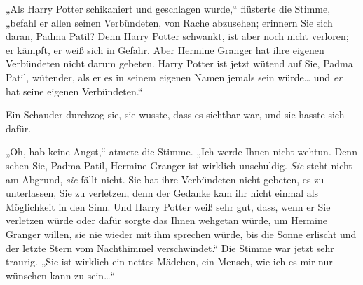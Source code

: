 „Als Harry Potter schikaniert und geschlagen wurde,“ flüsterte die Stimme, „befahl er allen seinen Verbündeten, von Rache abzusehen; erinnern Sie sich daran, Padma Patil? Denn Harry Potter schwankt, ist aber noch nicht verloren; er kämpft, er weiß sich in Gefahr. Aber Hermine Granger hat ihre eigenen Verbündeten nicht darum gebeten. Harry Potter ist jetzt wütend auf Sie, Padma Patil, wütender, als er es in seinem eigenen Namen jemals sein würde… und \emph{er} hat seine eigenen Verbündeten.“

Ein Schauder durchzog sie, sie wusste, dass es sichtbar war, und sie hasste sich dafür.

„Oh, hab keine Angst,“ atmete die Stimme. „Ich werde Ihnen nicht wehtun. Denn sehen Sie, Padma Patil, Hermine Granger ist wirklich unschuldig. \emph{Sie} steht nicht am Abgrund, \emph{sie} fällt nicht. Sie hat ihre Verbündeten nicht gebeten, es zu unterlassen, Sie zu verletzen, denn der Gedanke kam ihr nicht einmal als Möglichkeit in den Sinn. Und Harry Potter weiß sehr gut, dass, wenn er Sie verletzen würde oder dafür sorgte das Ihnen wehgetan würde, um Hermine Granger willen, sie nie wieder mit ihm sprechen würde, bis die Sonne erlischt und der letzte Stern vom Nachthimmel verschwindet.“ Die Stimme war jetzt sehr traurig. „Sie ist wirklich ein nettes Mädchen, ein Mensch, wie ich es mir nur wünschen kann zu sein…“

